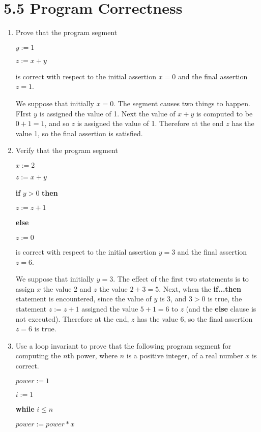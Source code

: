 \documentclass[11pt]{article}
\begin{document}
\section*{\textbf{5.5 Program Correctness}}
\begin{enumerate}[label=\textbf{\arabic*.}]
	\item Prove that the program segment
	
	\qquad $y := 1$
	
	\qquad $z := x + y$
	
	is correct with respect to the initial assertion $x = 0$ and the final assertion $z = 1$.
	
	We suppose that initially $x = 0$. The segment causes two things to happen. FIrst $y$ is assigned the value of 1. Next the value of $x + y$ is computed to be $0 + 1 = 1$, and so $z$ is assigned the value of 1. Therefore at the end $z$ has the value 1, so the final assertion is satisfied.
	
	\item Verify that the program segment
	
	\qquad $x := 2$
	
	\qquad $z := x + y$
	
	\qquad \textbf{if} $y > 0$ \textbf{then}
	
	\qquad\qquad $z := z + 1$
	
	\qquad \textbf{else}
	
	\qquad\qquad $z := 0$
	
	is correct with respect to the initial assertion $y = 3$ and the final assertion $z = 6$.
	
	We suppose that initially $y = 3$. The effect of the first two statements is to assign $x$ the value 2 and $z$ the value $2 + 3 = 5$. Next, when the \textbf{if...then} statement is encountered, since the value of $y$ is 3, and $3 > 0$ is true, the statement $z := z + 1$ assigned the value $5 + 1 = 6$ to $z$ (and the \textbf{else} clause is not executed). Therefore at the end, $z$ has the value 6, so the final assertion $z = 6$ is true.
	
	\item Use a loop invariant to prove that the following program segment for computing the $n$th power, where $n$ is a positive integer, of a real number $x$ is correct.
	
	\qquad $power := 1$
	
	\qquad $i := 1$
	
	\qquad \textbf{while} $i \leq n$
	
	\qquad\qquad $power := power * x$
	

\end{enumerate}
\end{document}
